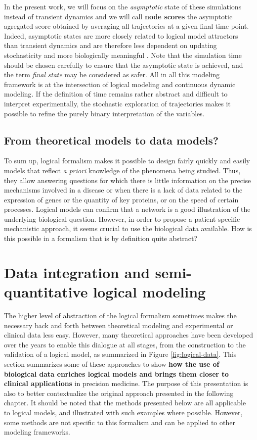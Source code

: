 \documentclass[a4paper,12pt,twoside,onecolumn,openright,final,oldfontcommands]{memoir}
\begin{document}
In the present work, we will focus on the \emph{asymptotic} state of
these simulations instead of transient dynamics and we will call
\textbf{node scores} the asymptotic agregated score obtained by
averaging all trajectories at a given final time point. Indeed,
asymptotic states are more closely related to logical model attractors
than transient dynamics and are therefore less dependent on updating
stochasticity and more biologically meaningful \citep{huang2009cancer}.
Note that the simulation time should be chosen carefully to ensure that
the asymptotic state is achieved, and the term \emph{final state} may be
considered as safer. All in all this modeling framework is at the
intersection of logical modeling and continuous dynamic modeling. If the
definition of time remains rather abstract and difficult to interpret
experimentally, the stochastic exploration of trajectories makes it
possible to refine the purely binary interpretation of the variables.

\subsection{From theoretical models to data
models?}\label{from-theoretical-models-to-data-models}

To sum up, logical formalism makes it possible to design fairly quickly
and easily models that reflect \emph{a priori} knowledge of the
phenomena being studied. Thus, they allow answering questions for which
there is little information on the precise mechanisms involved in a
disease or when there is a lack of data related to the expression of
genes or the quantity of key proteins, or on the speed of certain
processes. Logical models can confirm that a network is a good
illustration of the underlying biological question. However, in order to
propose a patient-specific mechanistic approach, it seems crucial to use
the biological data available. How is this possible in a formalism that
is by definition quite abstract?

\section{Data integration and semi-quantitative logical
modeling}\label{logical-data-section}

The higher level of abstraction of the logical formalism sometimes makes
the necessary back and forth between theoretical modeling and
experimental or clinical data less easy. However, many theoretical
approaches have been developed over the years to enable this dialogue at
all stages, from the construction to the validation of a logical model,
as summarized in Figure \ref{fig:logical-data}. This section summarizes
some of these approaches to show \textbf{how the use of biological data
enriches logical models and brings them closer to clinical applications}
in precision medicine. The purpose of this presentation is also to
better contextualize the original approach presented in the following
chapter. It should be noted that the methods presented below are all
applicable to logical models, and illustrated with such examples where
possible. However, some methods are not specific to this formalism and
can be applied to other modeling frameworks.
\end{document}
